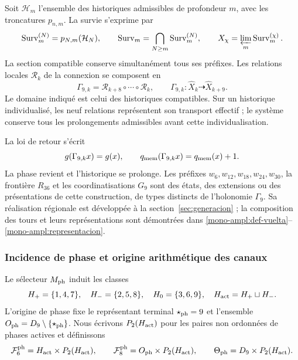 Soit \(\mathcal H_m\) l'ensemble des historiques admissibles de profondeur \(m\), avec les troncatures \(p_{n,m}\). La survie s'exprime par
\[
 \operatorname{Surv}_m^{(N)}=p_{N,m}(\mathcal H_N),\qquad
 \operatorname{Surv}_m=\bigcap_{N\geq m}
 \operatorname{Surv}_m^{(N)},\qquad
 X_\chi=\varprojlim_m\operatorname{Surv}_m^{(\chi)}.
\]
La section compatible conserve simultanément tous ses préfixes. Les relations locales \(\mathcal R_k\) de la connexion se composent en
\begin{equation}
 \Gamma_{9,k}=\mathcal R_{k+8}\circ\cdots\circ\mathcal R_k,\qquad
 \Gamma_{9,k}:\widehat X_k\dashrightarrow\widehat X_{k+9}.
 \label{ii:tpk-holonomia}
\end{equation}
Le domaine indiqué est celui des historiques compatibles. Sur un historique individualisé, les neuf relations représentent son transport effectif ; le système conserve tous les prolongements admissibles avant cette individualisation.

La loi de retour s'écrit
\[
 g(\Gamma_{9,k}x)=g(x),\qquad
 q_{\rm mem}(\Gamma_{9,k}x)=q_{\rm mem}(x)+1.
\]
La phase revient et l'historique se prolonge. Les préfixes \(w_6,w_{12},w_{18},w_{24},w_{30}\), la frontière \(R_{36}\) et les coordinatisations \(G_9\) sont des états, des extensions ou des présentations de cette construction, de types distincts de l'holonomie \(\Gamma_9\). Sa réalisation régionale est développée à la section~\ref{sec:generacion} ; la composition des tours et leurs représentations sont démontrées dans \ref{mono-ampl:def-vuelta}--\ref{mono-ampl:representacion}.

\subsubsection{Incidence de phase et origine arithmétique des canaux}

Le sélecteur \(M_{\rm ph}\) induit les classes
\[
 H_+=\{1,4,7\},\quad H_-=\{2,5,8\},\quad
 H_0=\{3,6,9\},\quad H_{\rm act}=H_+\sqcup H_-.
\]
L'origine de phase fixe le représentant terminal \(\star_{\rm ph}=9\) et l'ensemble \(O_{\rm ph}=D_9\setminus\{\star_{\rm ph}\}\). Nous écrivons \(P_2(H_{\rm act})\) pour les paires non ordonnées de phases actives et définissons
\[
 \mathcal F_6^{\rm ph}=H_{\rm act}\times P_2(H_{\rm act}),\qquad
 \mathcal F_8^{\rm ph}=O_{\rm ph}\times P_2(H_{\rm act}),\qquad
 \Theta_{\rm ph}=D_9\times P_2(H_{\rm act}).
\]

